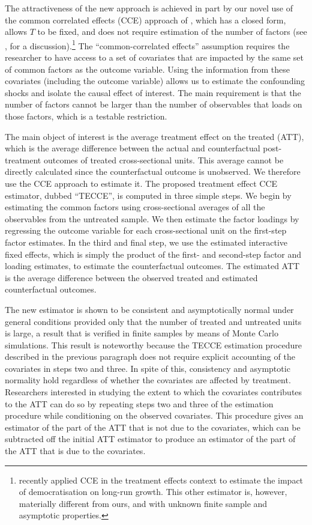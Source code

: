 \documentclass[12pt,fleqn]{article}
\begin{document}
  The attractiveness of the new approach is achieved in part by our novel use of the common correlated effects (CCE) approach of \citet{pesaran2006estimation}, which has a closed form, allows $T$ to be fixed, and does not require estimation of the number of factors (see \citealp{westerlund2019cce}, for a discussion).\footnote{\citet{Eberhardt2022} recently applied CCE in the treatment effects context to estimate the impact of democratisation on long-run growth. This other estimator is, however, materially different from ours, and with unknown finite sample and asymptotic properties.} The ``common-correlated effects'' assumption requires the researcher to have access to a set of covariates that are impacted by the same set of common factors as the outcome variable. Using the information from these covariates (including the outcome variable) allows us to estimate the confounding shocks and isolate the causal effect of interest. The main requirement is that the number of factors cannot be larger than the number of observables that loads on those factors, which is a testable restriction.
  
  The main object of interest is the average treatment effect on the treated (ATT), which is the average difference between the actual and counterfactual post-treatment outcomes of treated cross-sectional units. This average cannot be directly calculated since the counterfactual outcome is unobserved. We therefore use the CCE approach to estimate it. The proposed treatment effect CCE estimator, dubbed ``TECCE'', is computed in three simple steps. We begin by estimating the common factors using cross-sectional averages of all the observables from the untreated sample. We then estimate the factor loadings by regressing the outcome variable for each cross-sectional unit on the first-step factor estimates. In the third and final step, we use the estimated interactive fixed effects, which is simply the product of the first- and second-step factor and loading estimates, to estimate the counterfactual outcomes. The estimated ATT is the average difference between the observed treated and estimated counterfactual outcomes.
  
  The new estimator is shown to be consistent and asymptotically normal under general conditions provided only that the number of treated and untreated units is large, a result that is verified in finite samples by means of Monte Carlo simulations. This result is noteworthy because the TECCE estimation procedure described in the previous paragraph does not require explicit accounting of the covariates in steps two and three. In spite of this, consistency and asymptotic normality hold regardless of whether the covariates are affected by treatment. Researchers interested in studying the extent to which the covariates contributes to the ATT can do so by repeating steps two and three of the estimation procedure while conditioning on the observed covariates. This procedure gives an estimator of the part of the ATT that is not due to the covariates, which can be subtracted off the initial ATT estimator to produce an estimator of the part of the ATT that is due to the covariates.
  
\end{document}
